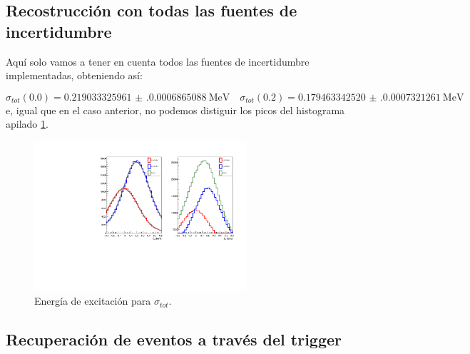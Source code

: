 \subsection{Recostrucción con todas las fuentes de incertidumbre}

Aquí solo vamos a tener en cuenta todos las fuentes de incertidumbre implementadas, obteniendo así: 

\begin{equation}
    \sigma_{tot}(0.0) =\num{0.219033325961(0.0006865088)} \ \text{MeV} \quad 
    \sigma_{tot}(0.2) = \num{0.179463342520(0.0007321261)} \ \text{MeV}
\end{equation} 
e, igual que en el caso anterior, no podemos distiguir los picos del histograma apilado \cref{Fig:05-RecExcIdx0}. 
\vspace*{-0.25cm}
\begin{figure}[H]
    \centering
    \includegraphics[width=0.7\textwidth]{Imagenes/Rec_incIdx0_single.pdf}
    \caption{Energía de excitación para $\sigma_{tot}$.}
    \label{Fig:05-RecExcIdx0}
\end{figure}


\subsection{Recuperación de eventos a través del trigger}

